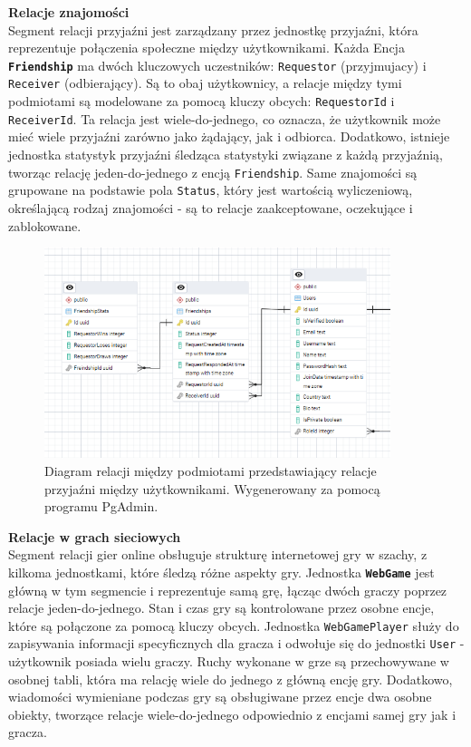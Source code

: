 \documentclass[12pt,a4paper]{article}
\begin{document}
\newpage

\noindent \textbf{Relacje znajomości}\\
Segment relacji przyjaźni jest zarządzany przez jednostkę przyjaźni, która reprezentuje połączenia społeczne między użytkownikami. Każda Encja \textbf{\texttt{Friendship}} ma dwóch kluczowych uczestników: \texttt{Requestor} (przyjmujacy) i \texttt{Receiver} (odbierający). Są to obaj użytkownicy, a relacje między tymi podmiotami są modelowane za pomocą kluczy obcych: \texttt{RequestorId} i \texttt{ReceiverId}. Ta relacja jest wiele-do-jednego, co oznacza, że użytkownik może mieć wiele przyjaźni zarówno jako żądający, jak i odbiorca. Dodatkowo, istnieje jednostka statystyk przyjaźni śledząca statystyki związane z każdą przyjaźnią, tworząc relację jeden-do-jednego z encją \texttt{Friendship}. Same znajomości są grupowane na podstawie pola \texttt{Status}, który jest wartością wyliczeniową, określającą rodzaj znajomości - są to relacje zaakceptowane, oczekujące i zablokowane.

\vspace{1cm}
\begin{figure}[h!]
    \centering
    \includegraphics[width=0.9\textwidth]{images/ERD_friendship.png}
    \caption{Diagram relacji między podmiotami przedstawiający relacje przyjaźni między użytkownikami. Wygenerowany za pomocą programu PgAdmin.}
\end{figure}

\newpage

\noindent \textbf{Relacje w grach sieciowych}\\
Segment relacji gier online obsługuje strukturę internetowej gry w szachy, z kilkoma jednostkami, które śledzą różne aspekty gry. Jednostka \textbf{\texttt{WebGame}} jest główną w tym segmencie i reprezentuje samą grę, łącząc dwóch graczy poprzez relacje jeden-do-jednego. Stan i czas gry są kontrolowane przez osobne encje, które są połączone za pomocą kluczy obcych. Jednostka \texttt{WebGamePlayer} służy do zapisywania informacji specyficznych dla gracza i odwołuje się do jednostki \texttt{User} - użytkownik posiada wielu graczy. Ruchy wykonane w grze są przechowywane w osobnej tabli, która ma relację wiele do jednego z główną encję gry. Dodatkowo, wiadomości wymieniane podczas gry są obsługiwane przez encje dwa osobne obiekty, tworzące relacje wiele-do-jednego odpowiednio z encjami samej gry jak i gracza.
\end{document}
